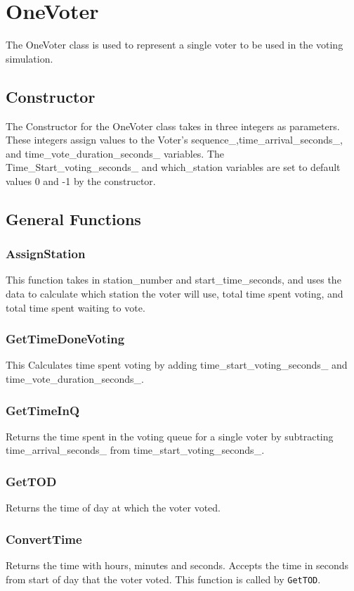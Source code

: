%

\chapter{OneVoter}

\vspace{-1.0cm}

The OneVoter class is used to represent a single voter to be used in the voting simulation.

\section{Constructor}
The Constructor for the OneVoter class takes in three integers as parameters.  These integers assign values to the Voter's sequence\_,time\_arrival\_seconds\_, and time\_vote\_duration\_seconds\_ variables.  The Time\_Start\_voting\_seconds\_ and which\_station variables are set to default values 0 and -1 by the constructor.

\section{General Functions}

\subsection{AssignStation}

This function takes in station\_number and start\_time\_seconds, and uses the data to calculate which station the voter will use, total time spent voting, and total time spent waiting to vote.

\subsection{GetTimeDoneVoting}
This Calculates time spent voting by adding time\_start\_voting\_seconds\_ and time\_vote\_duration\_seconds\_.

\subsection{GetTimeInQ}
Returns the time spent in the voting queue for a single voter by subtracting time\_arrival\_seconds\_ from time\_start\_voting\_seconds\_.

\subsection{GetTOD}
Returns the time of day at which the voter voted.

\subsection{ConvertTime}
Returns the time with hours, minutes and seconds. Accepts the time in seconds from start of day that the voter voted. This function is called by \texttt{GetTOD}.
